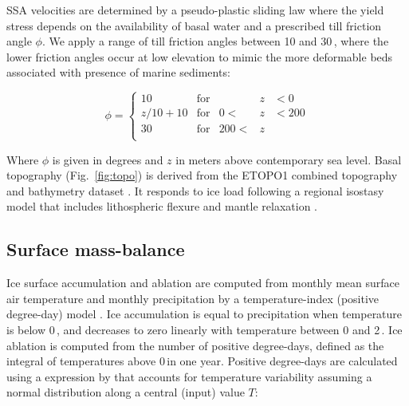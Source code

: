 SSA velocities are determined by a pseudo-plastic sliding law where the yield stress depends on the availability of basal water and a prescribed till friction angle $\phi$. We apply a range of till friction angles between 10 and 30\,\degree, where the lower friction angles occur at low elevation to mimic the more deformable beds associated with presence of marine sediments:
\needref
{}

\begin{equation}
	\phi = \left\{\begin{array}{llrll}
		10      & \mathrm{for} &      &z&<  0 \\
		z/10+10 & \mathrm{for} &   0 <&z&<200 \\
		30      & \mathrm{for} & 200 <&z&     \\
	\end{array}\right.
\end{equation}

Where $\phi$ is given in degrees and $z$ in meters above contemporary sea level. Basal topography (Fig.~\ref{fig:topo}) is derived from the ETOPO1 combined topography and bathymetry dataset \citep{data:etopo1}.  It responds to ice load following a regional isostasy model that includes lithospheric flexure and mantle relaxation \citep{lingle-clark-1985}.


\subsection{Surface mass-balance}

Ice surface accumulation and ablation are computed from monthly mean surface air temperature and monthly precipitation by a temperature-index (positive degree-day) model \citep{hock-2003}. Ice accumulation is equal to precipitation when temperature is below 0\,\degC, and decreases to zero linearly with temperature between 0 and 2\,\degC. Ice ablation is computed from the number of positive degree-days, defined as the integral of temperatures above 0\,\degC in one year. Positive degree-days are calculated using a expression by \citet{calov-greve-2005} that accounts for temperature variability assuming a normal distribution along a central (input) value $T$:

